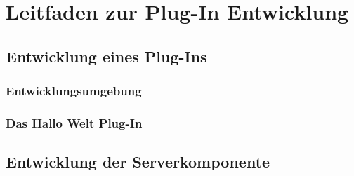 \chapter{Leitfaden zur Plug-In Entwicklung}
\label{cha:leitfaden}

\section{Entwicklung eines Plug-Ins}
\subsection{Entwicklungsumgebung}
\subsection{Das Hallo Welt Plug-In}

\section{Entwicklung der Serverkomponente}